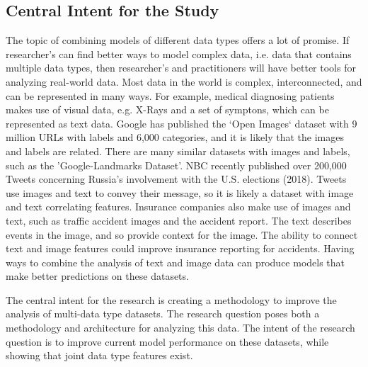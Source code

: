 \subsection{Central Intent for the Study}

The topic of combining models of different data types offers a lot of promise.  If researcher's can find better ways to model complex data, i.e. data that contains multiple data types, then researcher's and practitioners will have better tools for analyzing real-world data.  Most data in the world is complex, interconnected, and can be represented in many ways.  For example, medical diagnosing patients makes use of visual data, e.g. X-Rays and a set of symptons, which can be represented as text data.  Google has published the `Open Images` dataset with 9 million URLs with labels and 6,000 categories, and it is likely that the images and labels are related. There are many similar datasets with images and labels, such as the 'Google-Landmarks Dataset'. NBC recently published over 200,000 Tweets concerning Russia's involvement with the U.S. elections (2018).  Tweets use images and text to convey their message, so it is likely a dataset with image and text correlating features.  Insurance companies also make use of images and text, such as traffic accident images and the accident report.  The text describes events in the image, and so provide context for the image.  The ability to connect text and image features could improve insurance reporting for accidents.  Having ways to combine the analysis of text and image data can produce models that make better predictions on these datasets. %

The central intent for the research is creating a methodology to improve the analysis of multi-data type datasets.  The research question poses both a methodology and architecture for analyzing this data.  The intent of the research question is to improve current model performance on these datasets, while showing that joint data type features exist.



